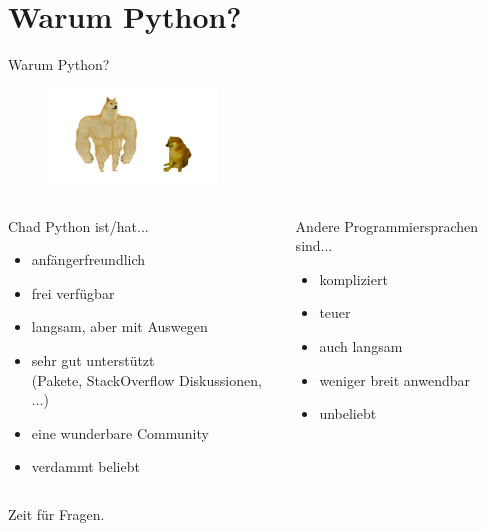 \section{Warum Python?}
\begin{frame}{Warum Python?}
	\begin{figure}
		\includegraphics[width=0.4\textwidth]{ChadPython.jpg}
		
	\end{figure}
	\begin{columns}
	\begin{column}{0.7\textwidth}
		Chad Python ist/hat...
		\begin{itemize}
			\item anfängerfreundlich
			\item frei verfügbar
			\item langsam, aber mit Auswegen
			\item sehr gut unterstützt \\(Pakete, StackOverflow Diskussionen, $\dots$)
			\item eine wunderbare Community
			\item verdammt beliebt
		\end{itemize}
	\end{column}
	\begin{column}{0.4\textwidth}
		Andere Programmiersprachen sind...
		\begin{itemize}
			\item kompliziert
			\item teuer
			\item auch langsam
			\item weniger breit anwendbar
			\item unbeliebt
		\end{itemize}
	\end{column}
	\end{columns}
	
\end{frame}

\begin{frame}
	\huge Zeit für Fragen.
\end{frame}


